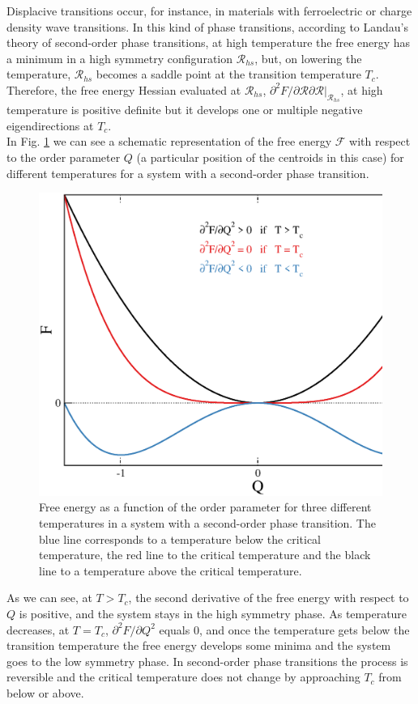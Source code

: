 Displacive transitions occur, for instance, in materials with ferroelectric or charge density wave transitions. In this kind of phase transitions, according to Landau's theory of second-order phase 
transitions\cite{lifshitz1980landau}, at high temperature the free energy has a minimum in a high symmetry configuration $\boldsymbol{\mathcal{R}}_{hs}$, but, on lowering the temperature, $\boldsymbol{\mathcal{R}}_{hs}$ 
becomes a saddle point at the transition temperature $T_{c}$. Therefore, the free energy Hessian evaluated at $\boldsymbol{\mathcal{R}}_{hs}$, $\partial^{2}F/\partial\boldsymbol{\mathcal{R\partial\boldsymbol{\mathcal{
R}}}}|_{\boldsymbol{\mathcal{R}}_{hs}}$, at high temperature is positive definite but it develops one or multiple negative eigendirections at $T_{c}$. \\

In Fig. \ref{transition} we can see a schematic representation of the free energy $\mathcal{F}$ with respect to the 
order parameter $Q$ (a particular position of the centroids in this case) for different temperatures for a system 
with a second-order phase transition.
\begin{figure}[h]
\begin{center}
\includegraphics[width=0.8\linewidth]{Figures/data.eps}
\caption[Free energy as a function of temperature in a second-order phase transition]{Free energy as a function of the order parameter for three different temperatures in a system with a second-order phase transition. The 
blue line corresponds to a temperature below the critical temperature, the red line to the critical temperature and the black line to a temperature above the critical temperature.}
\label{transition}
\end{center}
\end{figure}
As we can see, at $T>T_{c}$, the second derivative of the free energy with respect to $Q$ is positive, and the system stays in the high symmetry phase. As temperature decreases, at $T=T_{c}$, $\partial^{2}F/\partial Q^{2}$ equals 
$0$, and once the temperature gets below the transition temperature the free energy develops some minima and the system goes to the low symmetry phase. In second-order phase transitions the process is reversible and the critical 
temperature does not change by approaching $T_{c}$ from below or above. \\

